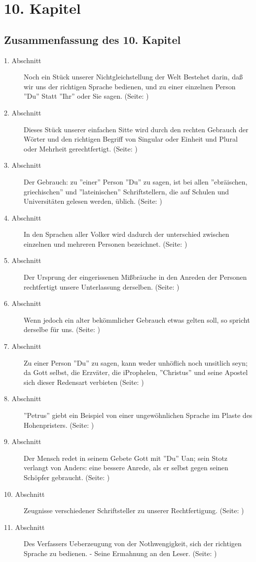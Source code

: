 
\chapter{10. Kapitel} \label{kap10}


\section{Zusammenfassung des 10. Kapitel}

\footnotesize
\begin{description}
\item[1. Abschnitt] Noch ein Stück unserer Nichtgleichstellung der Welt Bestehet
darin, daß wir uns der richtigen Sprache bedienen, und zu einer einzelnen Person
''Du'' Statt ''Ihr'' oder Sie sagen. (Seite: \pageref{kap10_ab1})
\item[2. Abschnitt] Dieses Stück unserer einfachen Sitte wird durch den rechten
Gebrauch der Wörter und den richtigen Begriff von Singular oder Einheit und
Plural oder Mehrheit gerechtfertigt. (Seite: \pageref{kap10_ab2})
\item[3. Abschnitt] Der Gebrauch: zu ''einer'' Person ''Du'' zu sagen, ist bei
allen ''ebräischen, griechischen'' und ''lateinischen'' Schriftstellern, die auf
Schulen und Universitäten gelesen werden, üblich. (Seite: \pageref{kap10_ab3})
\item[4. Abschnitt] In den Sprachen aller Volker wird dadurch der unterschied
zwischen einzelnen und mehreren Personen bezeichnet. (Seite: \pageref{kap10_ab4})
\item[5. Abschnitt] Der Ursprung der eingerissenen Mißbräuche in den Anreden der
Personen rechtfertigt unsere Unterlassung derselben. (Seite: \pageref{kap10_ab5})
\item[6. Abschnitt] Wenn jedoch ein alter bekömmlicher Gebrauch etwas gelten
soll, so spricht derselbe für uns. (Seite: \pageref{kap10_ab6})
\item[7. Abschnitt] Zu einer Person ''Du'' zu sagen, kann weder unhöflich noch
unsitlich seyn; da Gott selbst, die Erzväter, die iProphelen, ''Christus'' und
seine Apostel sich dieser Redensart verbieten (Seite: \pageref{kap10_ab7})
\item[8. Abschnitt] ''Petrus'' giebt ein Beispiel von einer ungewöhnlichen
Sprache im Plaste des Hohenpristers. (Seite: \pageref{kap10_ab8})
\item[9. Abschnitt] Der Mensch redet in seinem Gebete Gott mit ''Du'' Uan; sein
Stotz verlangt von Anders: eine bessere Anrede, als er selbst gegen seinen
Schöpfer gebraucht. (Seite: \pageref{kap10_ab9})
\item[10. Abschnitt] Zeugnisse verschiedener Schriftsteller zu unserer
Rechtfertigung. (Seite: \pageref{kap10_ab10})
\item[11. Abschnitt] Des Verfassers Ueberzeugung von der Nothwengigkeit, sich
der richtigen Sprache zu bedienen. - Seine Ermahnung an den Leser. (Seite: \pageref{kap10_ab11})

\end{description}
\normalsize

